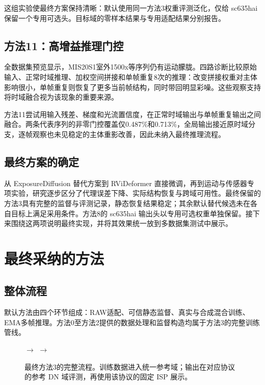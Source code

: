 \documentclass[11pt,a4paper,UTF8,fontset=fandol]{ctexart}
\begin{document}
这组实验使最终方案保持清晰：默认使用同一方法3权重评测泛化，仅给 sc635hai 保留一个专用可选头。目标域的零样本结果与专用适配结果分别报告。

\subsection{方法11：高增益推理门控}

全数据集预览显示，MIS20S1室外1500x等序列仍有运动朦胧。四路诊断比较原始输入、正常时域推理、加权空间拼接和单帧重复8次的推理：改变拼接权重对主体影响很小，单帧重复则恢复了更多当前帧结构，同时带回明显彩噪。这些观察支持将时域融合视为该现象的重要来源。

方法11尝试用输入残差、梯度和光流置信度，在正常时域输出与单帧重复输出之间融合。两条代表序列的非零门控覆盖仅0.487\%和0.713\%，全局输出接近原时域分支，逐帧观察也未见稳定的主体重影改善，因此未纳入最终推理流程。

\subsection{最终方案的确定}

从 ExposureDiffusion 替代方案到 RViDeformer 直接微调，再到运动与传感器专项实验，研究逐步区分了代理误差下降、实际结构恢复与跨域可用性。最终保留的方法3具有完整的监督与评测记录，静态恢复结果稳定；其余默认替代候选未在各自目标上满足采用条件。方法8的 sc635hai 输出头以专用可选权重单独保留。接下来围绕这两项说明最终实现，并将其效果统一放到多数据集测试中展示。

\section{最终采纳的方法}
\label{sec:adopted}

\subsection{整体流程}

默认方法由四个环节组成：RAW适配、可信静态监督、真实与合成混合训练、EMA多帧推理。方法0至方法2提供的数据处理和监督构造均属于方法3的完整训练管线。

\begin{figure}[!htbp]
\centering\small
{}
$\longrightarrow$
$\longrightarrow$
\caption{最终方法3的完整流程。训练数据进入统一参考域；输出在对应协议的参考 DN 域评测，再使用该协议的固定 ISP 展示。}
\label{fig:adopted_pipeline}
\end{figure}
\end{document}
